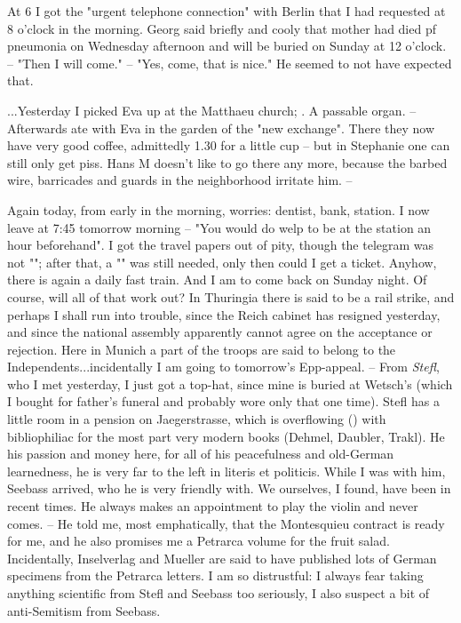 
At 6 I got the "urgent telephone connection" with Berlin that I had requested at 8 o'clock in the morning. Georg said briefly and cooly that mother had died pf pneumonia on Wednesday afternoon and will be buried on Sunday at 12 o'clock. -- "Then I will come." -- "Yes, come, that is nice." He seemed to not have expected that.

...Yesterday I picked Eva up at the Matthaeu church; . A passable organ. -- Afterwards ate with Eva in the garden of the "new exchange". There they now have very good coffee, admittedly 1.30 for a little cup -- but in Stephanie one can still only get piss. Hans M doesn't like to go there any more, because the barbed wire, barricades and guards in the neighborhood irritate him. --

Again today, from early in the morning, worries: dentist, bank, station. I now leave at 7:45 tomorrow morning -- "You would do welp to be at the station an hour beforehand". I got the travel papers out of pity, though the telegram was not ""; after that, a "" was still needed, only then could I get a ticket. Anyhow, there is again a daily fast train. And I am to come back on Sunday night. Of course, will all of that work out? In Thuringia there is said to be a rail strike, and perhaps I shall run into trouble, since the Reich cabinet has resigned yesterday, and since the national assembly apparently cannot agree on the acceptance or rejection. Here in Munich a part of the troops are said to belong to the Independents...incidentally I am going to tomorrow's Epp-appeal. -- From \textit{Stefl}, who I met yesterday, I just got a top-hat, since mine is buried at Wetsch's (which I bought for father's funeral and probably wore only that one time). Stefl has a little room in a pension on Jaegerstrasse, which is overflowing () with bibliophiliac for the most part very modern books (Dehmel, Daubler, Trakl). He  his passion and money here, for all of his peacefulness and old-German learnedness, he is very far to the left  in literis et politicis. While I was with him, Seebass arrived, who he is very friendly with. We ourselves, I found, have been  in recent times. He always makes an appointment to play the violin and never comes. -- He told me, most emphatically, that the Montesquieu contract is ready for me, and he also promises me a Petrarca volume for the fruit salad. Incidentally, Inselverlag and Mueller are said to have published lots of German specimens from the Petrarca letters. I am so distrustful: I always fear taking anything scientific from Stefl and Seebass too seriously, I also suspect a bit of anti-Semitism from Seebass.

